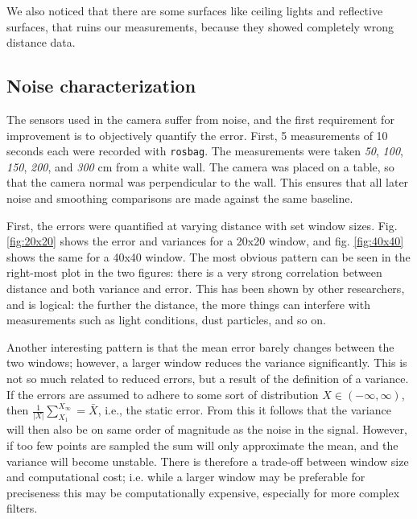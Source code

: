 \documentclass[11pt]{article}
\begin{document}
We also noticed that there are some surfaces like ceiling lights and reflective 
surfaces, that ruins our measurements, because they showed completely wrong distance 
data. \par
	


\subsection{Noise characterization}

The sensors used in the camera suffer from noise, and the first requirement for
improvement is to objectively quantify the error. First, 5 measurements of 10
seconds each were recorded with \texttt{rosbag}. The measurements were taken
\emph{50}, \emph{100}, \emph{150}, \emph{200}, and \emph{300} cm from a white
wall. The camera was placed on a table, so that the camera normal was
perpendicular to the wall. This ensures that all later noise and smoothing
comparisons are made against the same baseline. \par

First, the errors were quantified at varying distance with set window
sizes. Fig. \vref{fig:20x20} shows the error and variances for a 20x20 window,
and fig. \vref{fig:40x40} shows the same for a 40x40 window. The most obvious
pattern can be seen in the right-most plot in the two figures: there is a very
strong correlation between distance and both variance and error. This has been
shown by other researchers, and is logical: the further the distance, the more
things can interfere with measurements such as light conditions, dust particles,
and so on. \par

Another interesting pattern is that the mean error barely changes between the
two windows; however, a larger window reduces the variance significantly. This
is not so much related to reduced errors, but a result of the definition of a
variance. If the errors are assumed to adhere to some sort of distribution
$X \in \left(-\infty, \infty \right)$, then $\frac{1}{\left|X\right|}\sum_{X_1}^{X_\infty} = \bar{X}$,
i.e., the static error. From this it follows that the variance will then also be
on same order of magnitude as the noise in the signal. However, if too few
points are sampled the sum will only approximate the mean, and the variance will
become unstable. There is therefore a trade-off between window size and
computational cost; i.e. while a larger window may be preferable for preciseness
this may be computationally expensive, especially for more complex filters. \par
\end{document}
